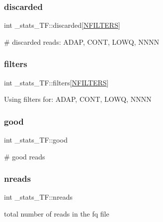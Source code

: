 \subsubsection{\texorpdfstring{discarded}{discarded}}
{\footnotesize\ttfamily int \+\_\+stats\+\_\+\+T\+F\+::discarded\mbox{[}\mbox{\hyperlink{defines_8h_a23f1103d8247781ab0be4b0fba2f085f}{N\+F\+I\+L\+T\+E\+RS}}\mbox{]}}

\# discarded reads\+: A\+D\+AP, C\+O\+NT, L\+O\+WQ, N\+N\+NN \mbox{\label{struct__stats__TF_a47d4caef2878e2c10e7571cfdd2d9619}} 
\subsubsection{\texorpdfstring{filters}{filters}}
{\footnotesize\ttfamily int \+\_\+stats\+\_\+\+T\+F\+::filters\mbox{[}\mbox{\hyperlink{defines_8h_a23f1103d8247781ab0be4b0fba2f085f}{N\+F\+I\+L\+T\+E\+RS}}\mbox{]}}

Using filters for\+: A\+D\+AP, C\+O\+NT, L\+O\+WQ, N\+N\+NN \mbox{\label{struct__stats__TF_a4d36ddc878d561051a0f9464df2e0911}} 
\subsubsection{\texorpdfstring{good}{good}}
{\footnotesize\ttfamily int \+\_\+stats\+\_\+\+T\+F\+::good}

\# good reads \mbox{\label{struct__stats__TF_a2a3993588191eb9f03416cce4fb1862f}} 
\subsubsection{\texorpdfstring{nreads}{nreads}}
{\footnotesize\ttfamily int \+\_\+stats\+\_\+\+T\+F\+::nreads}

total number of reads in the fq file \mbox{\label{struct__stats__TF_a399de2eb5fd452f019d5c8d23bae0651}} 
